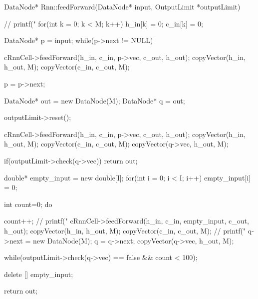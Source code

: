 DataNode* Rnn::feedForward(DataNode* input, OutputLimit *outputLimit){
  // printf("%
  for(int k = 0; k < M; k++){
    h_in[k] = 0;
    c_in[k] = 0;
  }

  DataNode* p = input;
  while(p->next != NULL){


    cRnnCell->feedForward(h_in, c_in, p->vec, c_out, h_out);
    copyVector(h_in, h_out, M);
    copyVector(c_in, c_out, M);

    p = p->next;
  }

  DataNode* out = new DataNode(M);
  DataNode* q = out;

  outputLimit->reset();

  cRnnCell->feedForward(h_in, c_in, p->vec, c_out, h_out);
  copyVector(h_in, h_out, M);
  copyVector(c_in, c_out, M);
  copyVector(q->vec, h_out, M);

  if(outputLimit->check(q->vec)) return out;

 double* empty_input = new double[I];
 for(int i = 0; i < I; i++)
  empty_input[i] = 0;


  int count=0;
  do{
    count++;
    // printf("%
    cRnnCell->feedForward(h_in, c_in, empty_input, c_out, h_out);
    copyVector(h_in, h_out, M);
    copyVector(c_in, c_out, M);
    // printf("%
    q->next = new DataNode(M);
    q = q->next;
    copyVector(q->vec, h_out, M);




  }while(outputLimit->check(q->vec) == false && count < 100);

  delete [] empty_input;

  return out;
}

